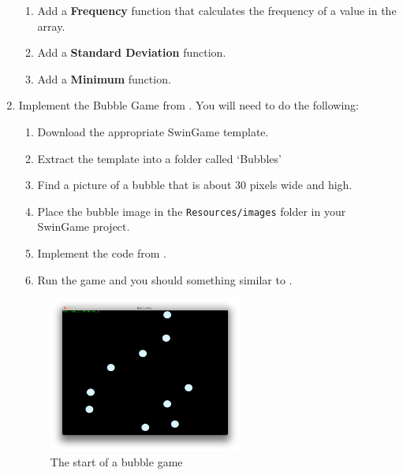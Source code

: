 \begin{enumerate}
\begin{enumerate}
      \item Add a \textbf{Frequency} function that calculates the frequency of a value in the array.
\begin{figure}[h]
\end{figure}

      \item Add a \textbf{Standard Deviation} function.
      \begin{figure}[h]
      \end{figure}

      \item Add a \textbf{Minimum} function.
      \begin{figure}[h]
      \end{figure}
  \end{enumerate}
  \clearpage
  \item Implement the Bubble Game from  . You will need to do the following:
  \begin{enumerate}
    \item Download the appropriate SwinGame template.
    \item Extract the template into a folder called `Bubbles'
    \item Find a picture of a bubble that is about 30 pixels wide and high.
    \item Place the bubble image in the \texttt{Resources/images} folder in your SwinGame project.
    \item Implement the code from .
    \item Run the game and you should something similar to .
  \end{enumerate}
  
  \begin{figure}[h]
     \centering
     \includegraphics[width=0.6\textwidth]{./topics/arrays/exercises/BubblesGame.png} 
     \caption{The start of a bubble game}
     \label{fig:bubble_game}
  \end{figure}
  

\end{enumerate}
